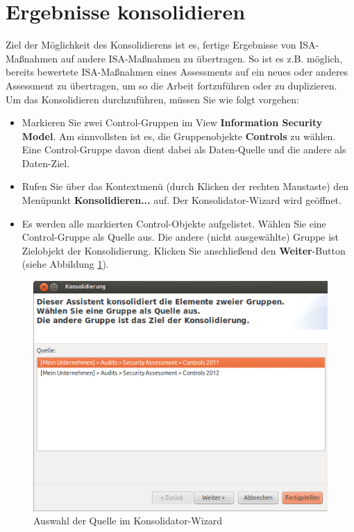 \documentclass[a4paper,10pt]{book}
\begin{document}
\section{Ergebnisse konsolidieren}
Ziel der Möglichkeit des Konsolidierens ist es, fertige Ergebnisse von ISA-Maßnahmen auf andere ISA-Maßnahmen zu übertragen. So ist es z.B. möglich, bereits bewertete ISA-Maßnahmen eines Assessments auf ein neues oder anderes Assessment zu übertragen, um so die Arbeit fortzuführen oder zu duplizieren.
\newline\\
Um das Konsolidieren durchzuführen, müssen Sie wie folgt vorgehen:
\begin{itemize}
 \item Markieren Sie zwei Control-Gruppen im View \textbf{Information Security Model}. Am sinnvollsten ist es, die Gruppenobjekte \textbf{Controls} zu wählen. Eine Control-Gruppe davon dient dabei als Daten-Quelle und die andere als Daten-Ziel.
 \item Rufen Sie über das Kontextmenü (durch Klicken der rechten Maustaste) den Menüpunkt \textbf{Konsolidieren...} auf. Der Konsolidator-Wizard wird geöffnet.
 \item Es werden alle markierten Control-Objekte aufgelistet. Wählen Sie eine Control-Gruppe als Quelle aus. Die andere (nicht ausgewählte)
Gruppe ist Zielobjekt der Konsolidierung. Klicken Sie anschließend den \textbf{Weiter}-Button (siehe Abbildung \ref{Auswahl der Quelle im Konsolidator-Wizard}).
\end{itemize}
\begin{figure}[htb!]
  \centering
  \includegraphics[scale=.6]{Screenshot/Isa_konsolidator_1.png}
  \caption{\label{Auswahl der Quelle im Konsolidator-Wizard} Auswahl der Quelle im Konsolidator-Wizard}
\end{figure}
\end{document}
